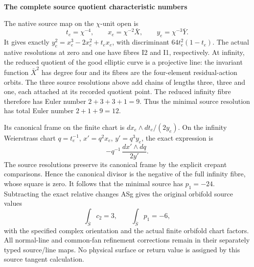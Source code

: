 \par

\medskip\noindent\textbf{The complete source quotient characteristic numbers}

\par\nobreak

The native source map on the \(\chi\)-unit open is
\[
 t_e=\chi^{-4},\qquad
 x_e=\chi^{-2}\bar X,\qquad y_e=\chi^{-3}\bar Y.
\]
It gives exactly \(y_e^2=x_e^3-2x_e^2+t_ex_e\), with
discriminant \(64t_e^2(1-t_e)\). The actual native resolutions
at zero and one have fibres I2 and I1, respectively. At infinity,
the reduced quotient of the good elliptic curve is a projective
line: the invariant function \(\bar X^2\) has degree four and
its fibres are the four-element residual-action orbits. The
three source resolutions above add chains of lengths three,
three and one, each attached at its recorded quotient point.
The reduced infinity fibre therefore has Euler number
\(2+3+3+1=9\). Thus the minimal source resolution has total
Euler number \(2+1+9=12\).

Its canonical frame on the finite chart is
\(dx_e\wedge dt_e/(2y_e)\). On the infinity Weierstrass
chart \(q=t_e^{-1}\), \(x'=q^2x_e\), \(y'=q^3y_e\),
the exact expression is
\[
 -q^{-1}\,\frac{dx'\wedge dq}{2y'}.
\]
The source resolutions preserve its canonical frame by the
explicit crepant comparisons. Hence the canonical divisor is
the negative of the full infinity fibre, whose square is zero.
It follows that the minimal source has \(p_1=-24\).
Subtracting the exact relative changes ASg gives the original
orbifold source values
\[
 \int_{\bar S}c_2=3,\qquad
 \int_{\bar S}p_1=-6,
\tag{ASh}
\]
with the specified complex orientation and the actual finite
orbifold chart factors. All normal-line and common-fan
refinement corrections remain in their separately typed
source/line maps. No physical surface or return value is
assigned by this source tangent calculation.


